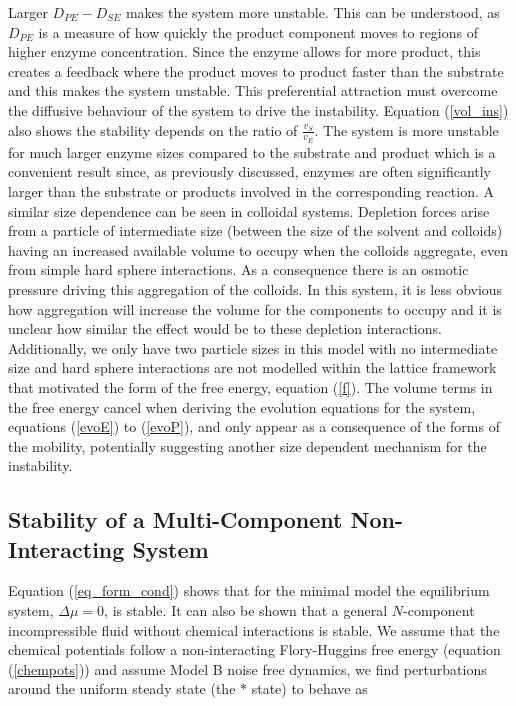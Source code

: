 Larger $D_{PE}-D_{SE}$ makes the system more unstable. This can be understood, as $D_{PE}$ is a measure of how quickly the product component moves to regions of higher enzyme concentration. Since the enzyme allows for more product, this creates a feedback where the product moves to product faster than the substrate and this makes the system unstable. This preferential attraction must overcome the diffusive behaviour of the system to drive the instability. Equation (\ref{vol_ins}) also shows the stability depends on the ratio of $\frac{v_S}{v_E}$. The system is more unstable for much larger enzyme sizes compared to the substrate and product which is a convenient result since, as previously discussed, enzymes are often significantly larger than the substrate or products involved in the corresponding reaction. A similar size dependence can be seen in colloidal systems. Depletion forces arise from a particle of  intermediate size (between the size of the solvent and colloids) having an increased available volume to occupy when the colloids aggregate, even from simple hard sphere interactions. As a consequence there is an osmotic pressure driving this aggregation of the colloids\cite{jones2002soft}. In this system, it is less obvious how aggregation will increase the volume for the components to occupy and it is unclear how similar the effect would be to these depletion interactions. Additionally, we only have two particle sizes in this model with no intermediate size and hard sphere interactions are not modelled within the lattice framework that motivated the form of the free energy, equation (\ref{f}). The volume terms in the free energy cancel when deriving the evolution equations for the system, equations (\ref{evoE}) to (\ref{evoP}), and only appear as a consequence of the forms of the mobility, potentially suggesting another size dependent mechanism for the instability.

\subsection{Stability of a Multi-Component Non-Interacting System}

Equation (\ref{eq_form_cond}) shows that for the minimal model the equilibrium system, $\Delta\mu=0$, is stable. It can also be shown that a general $N$-component incompressible fluid without chemical interactions is stable. We assume that the chemical potentials follow a non-interacting Flory-Huggins free energy (equation (\ref{chempots})) and assume Model B noise free dynamics, we find perturbations around the uniform steady state (the $*$ state) to behave as

